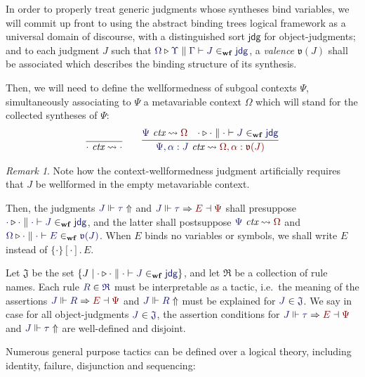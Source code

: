 \documentclass[11pt]{article}
\theoremstyle{definition}
\theoremstyle{remark}
\newtheorem{remark}[thm]{Remark}
\numberwithin{equation}{section}
\def\IModeColorName{MidnightBlue}
\def\OModeColorName{Maroon}
\newcommand\IMode[1]{{\color{\IModeColorName}{#1}}}
\newcommand\OMode[1]{{\color{\OModeColorName}{#1}}}
\newcommand\JJ{J}
\newcommand\RSet{\mathfrak{R}}
\newcommand\JSet{\mathfrak{J}}
\newcommand\IsTac[1]{\IMode{#1}\ \textit{tactic}}
\newcommand\MkSet[1]{\left\{#1\right\}}
\newcommand\IsWf[5]{%
  \IMode{#1}\triangleright%
  \IMode{#2}\parallel%
  \IMode{#3}\vdash%
  \IMode{#4}\in_{\mathbf{wf}}\IMode{#5}%
}
\newcommand\IsCtx[2]{
  \IMode{#1}\ \textit{ctx}\leadsto \OMode{#2}
}
\newcommand\SortJdg{\mathsf{jdg}}
\newcommand\MkBTm[3]{\{#1\}[#2].\, #3}
\newcommand\JdgValence[1]{\mathfrak{v}(#1)}
\newcommand\Refine[4]{\IMode{#1}\Vdash\IMode{#2}\Rightarrow\OMode{#4}\dashv\OMode{#3}}
\newcommand\NoRefine[2]{\IMode{#1}\Vdash\IMode{#2}\Uparrow}
\newcommand\Member[2]{\IMode{#1}\in\IMode{#2}}
\begin{document}
In order to properly treat generic judgments whose syntheses bind variables, we
will commit up front to using the abstract binding trees logical framework as a
universal domain of discourse, with a distinguished sort $\SortJdg$ for
object-judgments; and to each judgment $\JJ$ such that
$\IsWf{\Omega}{\Upsilon}{\Gamma}{\JJ}{\SortJdg}$, a \emph{valence}
$\JdgValence{\JJ}$ shall be associated which describes the binding structure of
its synthesis.

Then, we will need to define the wellformedness of subgoal contexts $\Psi$,
simultaneously associating to $\Psi$ a metavariable context $\Omega$ which will
stand for the collected syntheses of $\Psi$:
\begin{gather*}
  \infer{
    \IsCtx{\cdot}{\cdot}
  }{
  }\qquad
  \infer{
    \IsCtx{\Psi,\alpha:\JJ}{\Omega,\alpha:\JdgValence{\JJ}}
  }{
    \IsCtx{\Psi}{\Omega} &
    \IsWf{\cdot}{\cdot}{\cdot}{\JJ}{\SortJdg}
  }
\end{gather*}

\begin{remark}
  Note how the context-wellformedness judgment artificially requires that $\JJ$
  be wellformed in the empty metavariable context.
\end{remark}

Then, the judgments $\NoRefine{\JJ}{\tau}$ and $\Refine{\JJ}{\tau}{\Psi}{E}$
shall presuppose $\IsWf{\cdot}{\cdot}{\cdot}{\JJ}{\SortJdg}$, and the latter
shall postsuppose $\IsCtx{\Psi}{\Omega}$ and $\IsWf{\Omega}{\cdot}{\cdot}{E}{\JdgValence{\JJ}}$.
When $E$ binds no variables or symbols, we shall write $E$ instead of
$\MkBTm{\cdot}{\cdot}{E}$.

Let $\JSet$ be the set $\MkSet{\JJ\mid\IsWf{\cdot}{\cdot}{\cdot}{\JJ}{\SortJdg}}$,
and let $\RSet$ be a collection of rule names. Each rule $\Member{R}{\RSet}$
must be interpretable as a tactic, i.e.\ the meaning of the assertions
$\Refine{\JJ}{R}{\Psi}{E}$ and $\NoRefine{\JJ}{R}$ must be explained for
$\Member{J}{\JSet}$. We say \framebox{$\IsTac{\tau}$} in case for all
object-judgments $\Member{\JJ}{\JSet}$, the assertion conditions for
$\Refine{\JJ}{\tau}{\Psi}{E}$ and $\NoRefine{\JJ}{\tau}$ are well-defined and
disjoint.

Numerous general purpose tactics can be defined over a logical theory,
including identity, failure, disjunction and sequencing:
\end{document}
